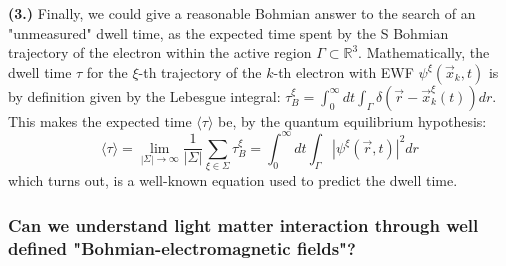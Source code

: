 \documentclass[11pt, a4paper]{article} %
\newcommand{\R}{\mathbb{R}} %
\begin{document}
{\bf (3.) }Finally, we could give a reasonable Bohmian answer to the search of an "unmeasured" dwell time, as the expected time spent by the S Bohmian trajectory of the electron within the active region $\Gamma\subset \R^3$. Mathematically, the dwell time $\tau$ for the $\xi$-th trajectory of the $k$-th electron with EWF $\psi^\xi(\vec{x}_k,t)$ is by definition given by the Lebesgue integral: $\tau^\xi_B= \int_{0}^\infty  dt \int_\Gamma \delta(\vec{r}-\vec{x}_k^\xi(t)) dr$. This makes the expected time $\langle \tau\rangle$ be, by the quantum equilibrium hypothesis:
\begin{equation}
\langle \tau \rangle = \lim_{|\Sigma|\rightarrow \infty}\frac{1}{|\Sigma|} \sum_{\xi\in\Sigma} \tau_B^\xi = \int_{0}^\infty dt \int_\Gamma |\psi^\xi(\vec{r},t)|^2dr
\end{equation}
which turns out, is a well-known equation used to predict the dwell time.

\subsubsection*{Can we understand light matter interaction through well defined "Bohmian-electromagnetic fields"?}
\end{document}
